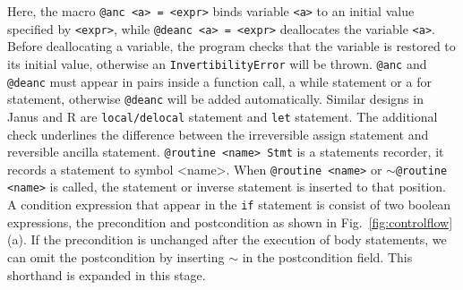 \documentclass[aps,twocolumn,longbibliography,english,superscriptaddress,prr]{revtex4-1}
\newcommand{\<}{\langle}
\renewcommand{\>}{\rangle}
\newcommand{\Fig}[1]{Fig.~\ref{#1}}
\theoremstyle{definition}\newtheorem{definition}{\textit{Definition}}
\begin{document}
    Here, the macro \texttt{@anc <a> = <expr>} binds variable \texttt{<a>} to an initial value specified by \texttt{<expr>}, while \texttt{@deanc <a> = <expr>} deallocates the variable \texttt{<a>}. Before deallocating a variable, the program checks that the variable is restored to its initial value, otherwise an \texttt{InvertibilityError} will be thrown. \texttt{@anc} and \texttt{@deanc} must appear in pairs inside a function call, a while statement or a for statement, otherwise \texttt{@deanc} will be added automatically. Similar designs in Janus and R are \texttt{local/delocal} statement and \texttt{let} statement. The additional check underlines the difference between the irreversible assign statement and reversible ancilla statement.
    \texttt{@routine <name> Stmt} is a statements recorder, it records a statement to symbol <name>. When \texttt{@routine <name>} or \texttt{$\sim$@routine <name>} is called, the statement or inverse statement is inserted to that position.
    A condition expression that appear in the \texttt{if} statement is consist of two boolean expressions, the precondition and postcondition as shown in \Fig{fig:controlflow} (a). If the precondition is unchanged after the execution of body statements, we can omit the postcondition by inserting \texttt{$\sim$} in the postcondition field. This shorthand is expanded in this stage.
    
\end{document}
